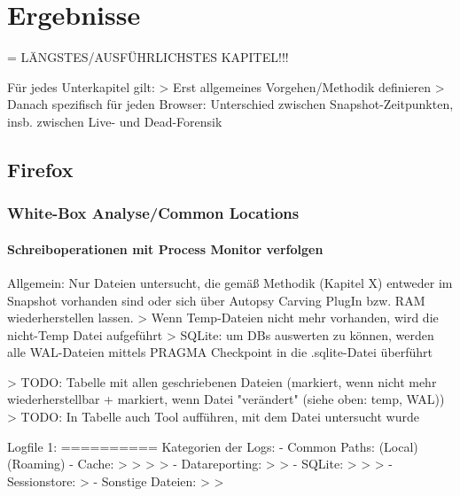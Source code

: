 \chapter{Ergebnisse}

= LÄNGSTES/AUSFÜHRLICHSTES KAPITEL!!!

Für jedes Unterkapitel gilt: 
> Erst allgemeines Vorgehen/Methodik definieren
> Danach spezifisch für jeden Browser: Unterschied zwischen Snapshot-Zeitpunkten, insb. zwischen Live- und Dead-Forensik

\section{Firefox}

\subsection*{White-Box Analyse/Common Locations}

\subsubsection*{Schreiboperationen mit Process Monitor verfolgen}

Allgemein: Nur Dateien untersucht, die gemäß Methodik (Kapitel X) entweder im Snapshot vorhanden sind oder sich über Autopsy Carving PlugIn bzw. RAM wiederherstellen lassen.
> Wenn Temp-Dateien nicht mehr vorhanden, wird die nicht-Temp Datei aufgeführt
> SQLite: um DBs auswerten zu können, werden alle WAL-Dateien mittels PRAGMA Checkpoint in die .sqlite-Datei überführt

> TODO: Tabelle mit allen geschriebenen Dateien (markiert, wenn nicht mehr wiederherstellbar + markiert, wenn Datei "verändert" (siehe oben: temp, WAL))
> TODO: In Tabelle auch Tool aufführen, mit dem Datei untersucht wurde

Logfile 1:
==========
Kategorien der Logs:
- Common Paths:
	(Local) %
	(Roaming) %
- Cache:
	> %
	> %
	> %
	> %
- Datareporting:
	> %
	> %
- SQLite:
	> %
	> %
	> %
- Sessionstore:
	> %
- Sonstige Dateien:
	> %
	> %
		

